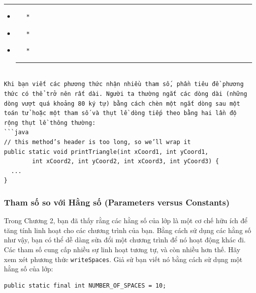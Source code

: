 \begin{center}\rule{0.5\linewidth}{0.5pt}\end{center}

\begin{itemize}
\item
\begin{verbatim}
   * 
\end{verbatim}
\item
\begin{verbatim}
   * 
\end{verbatim}
\item
\begin{verbatim}
   * 
\end{verbatim}

  \begin{center}\rule{0.5\linewidth}{0.5pt}\end{center}
\end{itemize}

\begin{verbatim}

Khi bạn viết các phương thức nhận nhiều tham số, phần tiêu đề phương thức có thể trở nên rất dài. Người ta thường ngắt các dòng dài (những dòng vượt quá khoảng 80 ký tự) bằng cách chèn một ngắt dòng sau một toán tử hoặc một tham số và thụt lề dòng tiếp theo bằng hai lần độ rộng thụt lề thông thường:
```java
// this method’s header is too long, so we’ll wrap it
public static void printTriangle(int xCoord1, int yCoord1,
        int xCoord2, int yCoord2, int xCoord3, int yCoord3) {
  ...
}
\end{verbatim}

\subsubsection{Tham số so với Hằng số (Parameters versus
Constants)}\label{tham-sux1ed1-so-vux1edbi-hux1eb1ng-sux1ed1-parameters-versus-constants}

Trong Chương 2, bạn đã thấy rằng các hằng số của lớp là một cơ chế hữu
ích để tăng tính linh hoạt cho các chương trình của bạn. Bằng cách sử
dụng các hằng số như vậy, bạn có thể dễ dàng sửa đổi một chương trình để
nó hoạt động khác đi. Các tham số cung cấp nhiều sự linh hoạt tương tự,
và còn nhiều hơn thế. Hãy xem xét phương thức \texttt{writeSpaces}. Giả
sử bạn viết nó bằng cách sử dụng một hằng số của lớp:

\begin{verbatim}
public static final int NUMBER_OF_SPACES = 10;
\end{verbatim}


